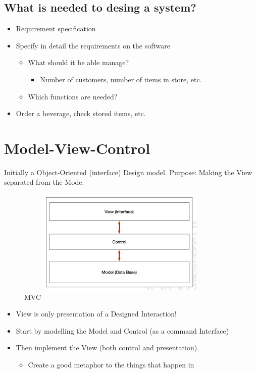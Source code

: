 \subsection{What is needed to desing a system?}
\begin{itemize}
\item Requirement specification
\item Specify in detail the requirements on the software
  \begin{itemize}
  \item What should it be able manage?
    \begin{itemize}
    \item Number of customers, number of items in store, etc.
    \end{itemize}
  \item Which functions are needed?
  \end{itemize}
\item Order a beverage, check stored items, etc.
\end{itemize}

\section{Model-View-Control}
Initially a Object-Oriented (interface) Design model.
Purpose: Making the View separated from the Mode.

\begin{figure}[h]
    \vspace{10mm}
    \centering
    \includegraphics[width=10cm, height=5cm]{image/mvc.png}
    \caption{MVC}
\end{figure}

\begin{itemize}
\item View is only presentation of a Designed Interaction!
\item Start by modelling the Model and Control (as a command Interface)
\item Then implement the View (both control and presentation).
  \begin{itemize}
  \item Create a good metaphor to the things that happen in
  \end{itemize}
\end{itemize}
